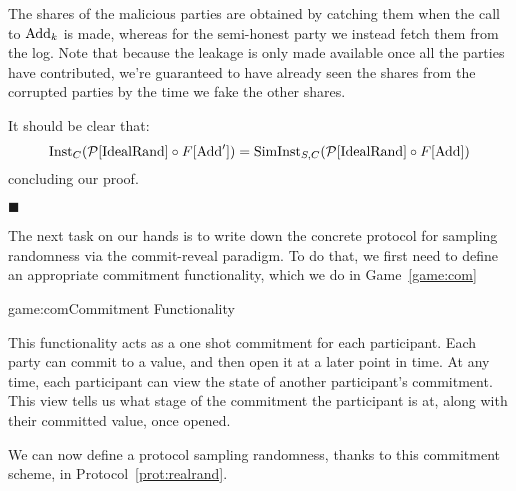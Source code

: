 \begin{claim}
    The shares of the malicious parties are obtained by catching them
    when the call to $\text{Add}_k$ is made, whereas for the semi-honest party
    we instead fetch them from the log.
    Note that because the leakage is only made available once all the parties
    have contributed, we're guaranteed to have already seen the shares
    from the corrupted parties by the time we fake the other shares.

    It should be clear that:
    $$
    \text{Inst}_C(\mathcal{P}[\text{IdealRand}] \circ F[\text{Add}']) = 
    \text{SimInst}_{S, C}(\mathcal{P}[\text{IdealRand}] \circ F[\text{Add}])
    $$
    concluding our proof.

    $\blacksquare$
\end{claim}

The next task on our hands is to write down the concrete protocol
for sampling randomness via the commit-reveal paradigm.
To do that, we first need to define an appropriate commitment functionality,
which we do in Game~\ref{game:com}

\begin{game}{game:com}{Commitment Functionality}
\end{game}

This functionality acts as a one shot commitment for each participant.
Each party can commit to a value, and then open it at a later point in time.
At any time, each participant can view the state of another participant's
commitment.
This view tells us what stage of the commitment the participant is at,
along with their committed value, once opened.

We can now define a protocol sampling randomness, thanks to this commitment
scheme, in Protocol~\ref{prot:realrand}.

